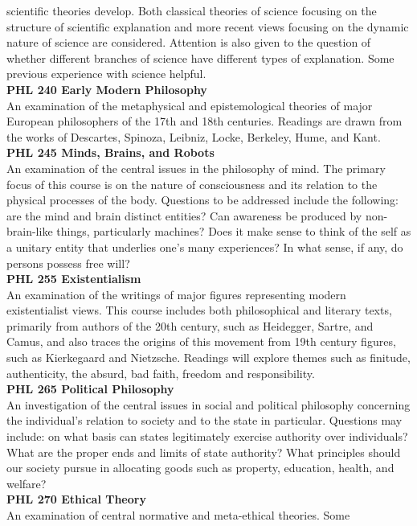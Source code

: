 \documentclass[
  letterpaper,
]{scrbook}
\begin{document}
scientific theories develop. Both classical theories of science focusing
on the structure of scientific explanation and more recent views
focusing on the dynamic nature of science are considered. Attention is
also given to the question of whether different branches of science have
different types of explanation. Some previous experience with science
helpful.\\
\textbf{PHL 240 Early Modern Philosophy}\\
An examination of the metaphysical and epistemological theories of major
European philosophers of the 17th and 18th centuries. Readings are drawn
from the works of Descartes, Spinoza, Leibniz, Locke, Berkeley, Hume,
and Kant.\\
\textbf{PHL 245 Minds, Brains, and Robots}\\
An examination of the central issues in the philosophy of mind. The
primary focus of this course is on the nature of consciousness and its
relation to the physical processes of the body. Questions to be
addressed include the following: are the mind and brain distinct
entities? Can awareness be produced by non-brain-like things,
particularly machines? Does it make sense to think of the self as a
unitary entity that underlies one's many experiences? In what sense, if
any, do persons possess free will?\\
\textbf{PHL 255 Existentialism}\\
An examination of the writings of major figures representing modern
existentialist views. This course includes both philosophical and
literary texts, primarily from authors of the 20th century, such as
Heidegger, Sartre, and Camus, and also traces the origins of this
movement from 19th century figures, such as Kierkegaard and Nietzsche.
Readings will explore themes such as finitude, authenticity, the absurd,
bad faith, freedom and responsibility.\\
\textbf{PHL 265 Political Philosophy}\\
An investigation of the central issues in social and political
philosophy concerning the individual's relation to society and to the
state in particular. Questions may include: on what basis can states
legitimately exercise authority over individuals? What are the proper
ends and limits of state authority? What principles should our society
pursue in allocating goods such as property, education, health, and
welfare?\\
\textbf{PHL 270 Ethical Theory}\\
An examination of central normative and meta-ethical theories. Some
\end{document}
